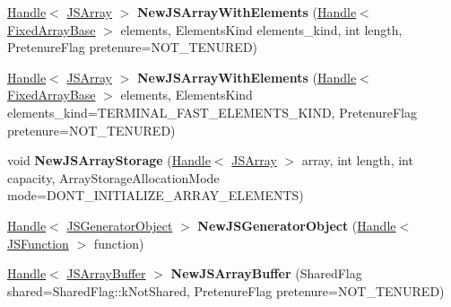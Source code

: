 \begin{DoxyCompactItemize}
\item 
\hyperlink{classv8_1_1internal_1_1_handle}{Handle}$<$ \hyperlink{classv8_1_1internal_1_1_j_s_array}{J\+S\+Array} $>$ {\bfseries New\+J\+S\+Array\+With\+Elements} (\hyperlink{classv8_1_1internal_1_1_handle}{Handle}$<$ \hyperlink{classv8_1_1internal_1_1_fixed_array_base}{Fixed\+Array\+Base} $>$ elements, Elements\+Kind elements\+\_\+kind, int length, Pretenure\+Flag pretenure=N\+O\+T\+\_\+\+T\+E\+N\+U\+R\+ED)\hypertarget{classv8_1_1internal_1_1_factory_ac961cb471c4a711dbd719ff063a248a6}{}\label{classv8_1_1internal_1_1_factory_ac961cb471c4a711dbd719ff063a248a6}

\item 
\hyperlink{classv8_1_1internal_1_1_handle}{Handle}$<$ \hyperlink{classv8_1_1internal_1_1_j_s_array}{J\+S\+Array} $>$ {\bfseries New\+J\+S\+Array\+With\+Elements} (\hyperlink{classv8_1_1internal_1_1_handle}{Handle}$<$ \hyperlink{classv8_1_1internal_1_1_fixed_array_base}{Fixed\+Array\+Base} $>$ elements, Elements\+Kind elements\+\_\+kind=T\+E\+R\+M\+I\+N\+A\+L\+\_\+\+F\+A\+S\+T\+\_\+\+E\+L\+E\+M\+E\+N\+T\+S\+\_\+\+K\+I\+ND, Pretenure\+Flag pretenure=N\+O\+T\+\_\+\+T\+E\+N\+U\+R\+ED)\hypertarget{classv8_1_1internal_1_1_factory_a9499bc8ce679c1cb53bfb0c59b7bf71e}{}\label{classv8_1_1internal_1_1_factory_a9499bc8ce679c1cb53bfb0c59b7bf71e}

\item 
void {\bfseries New\+J\+S\+Array\+Storage} (\hyperlink{classv8_1_1internal_1_1_handle}{Handle}$<$ \hyperlink{classv8_1_1internal_1_1_j_s_array}{J\+S\+Array} $>$ array, int length, int capacity, Array\+Storage\+Allocation\+Mode mode=D\+O\+N\+T\+\_\+\+I\+N\+I\+T\+I\+A\+L\+I\+Z\+E\+\_\+\+A\+R\+R\+A\+Y\+\_\+\+E\+L\+E\+M\+E\+N\+TS)\hypertarget{classv8_1_1internal_1_1_factory_a257b63d5e83e6547401061fca8f88821}{}\label{classv8_1_1internal_1_1_factory_a257b63d5e83e6547401061fca8f88821}

\item 
\hyperlink{classv8_1_1internal_1_1_handle}{Handle}$<$ \hyperlink{classv8_1_1internal_1_1_j_s_generator_object}{J\+S\+Generator\+Object} $>$ {\bfseries New\+J\+S\+Generator\+Object} (\hyperlink{classv8_1_1internal_1_1_handle}{Handle}$<$ \hyperlink{classv8_1_1internal_1_1_j_s_function}{J\+S\+Function} $>$ function)\hypertarget{classv8_1_1internal_1_1_factory_a6c52acbd2a618fcf31213df304ab0c03}{}\label{classv8_1_1internal_1_1_factory_a6c52acbd2a618fcf31213df304ab0c03}

\item 
\hyperlink{classv8_1_1internal_1_1_handle}{Handle}$<$ \hyperlink{classv8_1_1internal_1_1_j_s_array_buffer}{J\+S\+Array\+Buffer} $>$ {\bfseries New\+J\+S\+Array\+Buffer} (Shared\+Flag shared=Shared\+Flag\+::k\+Not\+Shared, Pretenure\+Flag pretenure=N\+O\+T\+\_\+\+T\+E\+N\+U\+R\+ED)\hypertarget{classv8_1_1internal_1_1_factory_ac88b520d080bf58cce044706f95821ad}{}\label{classv8_1_1internal_1_1_factory_ac88b520d080bf58cce044706f95821ad}


\end{DoxyCompactItemize}
